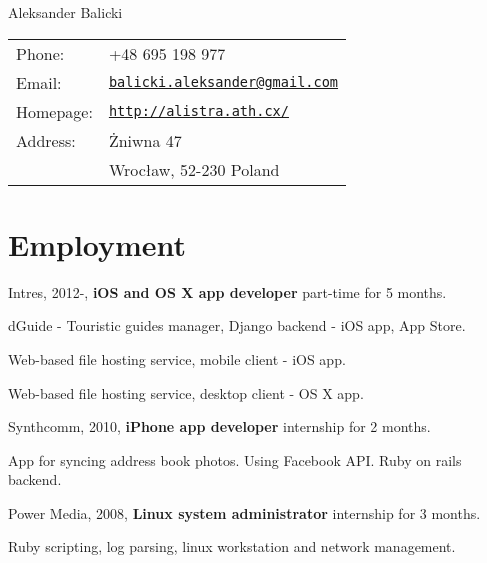 \documentclass[letterpaper]{article}
\def\name{Aleksander Balicki}
\renewenvironment{itemize}{
  \begin{list}{}{
    \setlength{\leftmargin}{1.5em}
  }
}{
  \end{list}
}
\begin{document}
{\huge \name}


\vspace{0.25in}

\begin{minipage}{0.45\linewidth}
  \begin{tabular}{ll}
    Phone: 	& +48 695 198 977 \\
    Email: 	& \href{mailto:balicki.aleksander@gmail.com}{\tt balicki.aleksander@gmail.com} \\
    Homepage: 	& \href{http://alistra.ath.cx/}{\tt http://alistra.ath.cx/} \\
    Address: 	& Żniwna 47\\
    		& Wrocław, 52-230 Poland
  \end{tabular}
\end{minipage}

\section*{Employment}

\begin{itemize}
	\item Intres, 2012-, {\bf iOS and OS X app developer} part-time for 5 months.
		\begin{itemize}
			\item dGuide - Touristic guides manager, Django backend - iOS app, App Store.
			\item Web-based file hosting service, mobile client - iOS app.
			\item Web-based file hosting service, desktop client - OS X app.
		\end{itemize}
	\item Synthcomm, 2010, {\bf iPhone app developer} internship for 2 months.
		\begin{itemize}
			\item App for syncing address book photos. Using Facebook API. Ruby on rails backend.
		\end{itemize}
	\item Power Media, 2008, {\bf Linux system administrator} internship for 3 months.
		\begin{itemize}
			\item Ruby scripting, log parsing, linux workstation and network management.
		\end{itemize}
\end{itemize}
\end{document}

